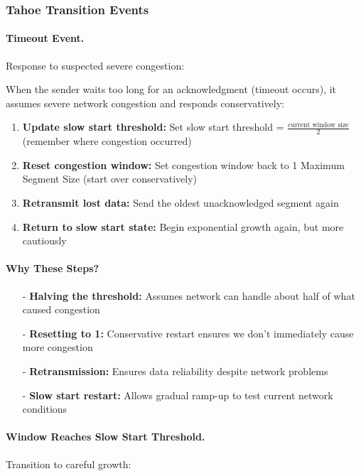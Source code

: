 \documentclass[../../compsys.tex]{subfiles}
\begin{document}
\subsubsection{Tahoe Transition Events}

\paragraph{Timeout Event.} Response to suspected severe congestion:

When the sender waits too long for an acknowledgment (timeout occurs), it assumes severe network congestion and responds conservatively:

\begin{enumerate}
  \item \textbf{Update slow start threshold:} Set slow start threshold = $\frac{\text{current window size}}{2}$ (remember where congestion occurred)
  \item \textbf{Reset congestion window:} Set congestion window back to 1 Maximum Segment Size (start over conservatively)
  \item \textbf{Retransmit lost data:} Send the oldest unacknowledged segment again
  \item \textbf{Return to slow start state:} Begin exponential growth again, but more cautiously
\end{enumerate}

\paragraph{Why These Steps?}
\begin{itemize}
  \item[-] \textbf{Halving the threshold:} Assumes network can handle about half of what caused congestion
  \item[-] \textbf{Resetting to 1:} Conservative restart ensures we don't immediately cause more congestion
  \item[-] \textbf{Retransmission:} Ensures data reliability despite network problems
  \item[-] \textbf{Slow start restart:} Allows gradual ramp-up to test current network conditions
\end{itemize}

\paragraph{Window Reaches Slow Start Threshold.} Transition to careful growth:
\end{document}

